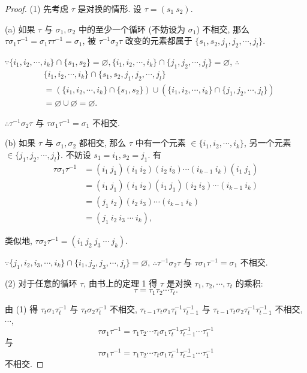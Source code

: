 \documentclass{ctexart}
\begin{document}
\begin{proof}
    (1) 先考虑 $\tau$ 是对换的情形. 设 $\tau=(s_1\ s_2)$.
    
    (a) 如果 $\tau$ 与 $\sigma_1,\sigma_2$ 中的至少一个循环 (不妨设为 $\sigma_1$) 不相交, 那么 $\tau\sigma_1\tau^{-1}=\sigma_1\tau\tau^{-1}=\sigma_1$, 被 $\tau^{-1}\sigma_2\tau$ 改变的元素都属于 $\{s_1,s_2,j_1,j_2,\cdots,j_l\}$.
    
    $\because\{i_1,i_2,\cdots,i_k\}\cap\{s_1,s_2\}=\varnothing,\{i_1,i_2,\cdots,i_k\}\cap\{j_1,j_2,\cdots,j_l\}=\varnothing$, $\therefore$
    \begin{align*}
        & \{i_1,i_2,\cdots,i_k\}\cap\{s_1,s_2,j_1,j_2,\cdots,j_l\} \\
        & =(\{i_1,i_2,\cdots,i_k\}\cap\{s_1,s_2\})\cup(\{i_1,i_2,\cdots,i_k\}\cap\{j_1,j_2,\cdots,j_l\}) \\
        & =\varnothing\cup\varnothing=\varnothing.
    \end{align*}

    $\therefore\tau^{-1}\sigma_2\tau$ 与 $\tau\sigma_1\tau^{-1}=\sigma_1$ 不相交.

    (b) 如果 $\tau$ 与 $\sigma_1,\sigma_2$ 都相交, 那么 $\tau$ 中有一个元素 $\in\{i_1,i_2,\cdots,i_k\}$, 另一个元素 $\in\{j_1,j_2,\cdots,j_l\}$. 不妨设 $s_1=i_1,s_2=j_1$. 有
    \begin{align*}
        \tau\sigma_1\tau^{-1} & =(i_1\ j_1)(i_1\ i_2)(i_2\ i_3)\cdots(i_{k-1}\ i_k)(i_1\ j_1) \\
        & =(i_1\ j_1)(i_1\ i_2)(i_1\ j_1)(i_2\ i_3)\cdots(i_{k-1}\ i_k) \\
        & =(j_1\ i_2)(i_2\ i_3)\cdots(i_{k-1}\ i_k) \\
        & =(j_1\ i_2\ i_3\ \cdots\ i_k),
    \end{align*}

    类似地, $\tau\sigma_2\tau^{-1}=(i_1\ j_2\ j_3\ \cdots\ j_k)$.
    
    $\because\{j_1,i_2,i_3,\cdots,i_k\}\cap\{i_1,j_2,j_3,\cdots,j_l\}=\varnothing$, $\therefore\tau^{-1}\sigma_2\tau$ 与 $\tau\sigma_1\tau^{-1}=\sigma_1$ 不相交.

    (2) 对于任意的循环 $\tau$, 由书上的定理 1 得 $\tau$ 是对换 $\tau_1,\tau_2,\cdots,\tau_t$ 的乘积:
    \[\tau=\tau_1\tau_2\cdots\tau_t.\]

    由 (1) 得 $\tau_t\sigma_1\tau_t^{-1}$ 与 $\tau_t\sigma_2\tau_t^{-1}$ 不相交, $\tau_{t-1}\tau_t\sigma_1\tau_t^{-1}\tau_{t-1}^{-1}$ 与 $\tau_{t-1}\tau_t\sigma_2\tau_t^{-1}\tau_{t-1}^{-1}$ 不相交, $\cdots$,
    \[\tau\sigma_1\tau^{-1}=\tau_1\tau_2\cdots\tau_t\sigma_1\tau_t^{-1}\tau_{t-1}^{-1}\cdots\tau_1^{-1}\]
    与
    \[\tau\sigma_1\tau^{-1}=\tau_1\tau_2\cdots\tau_t\sigma_1\tau_t^{-1}\tau_{t-1}^{-1}\cdots\tau_1^{-1}\]
    不相交.
\end{proof}
\end{document}
